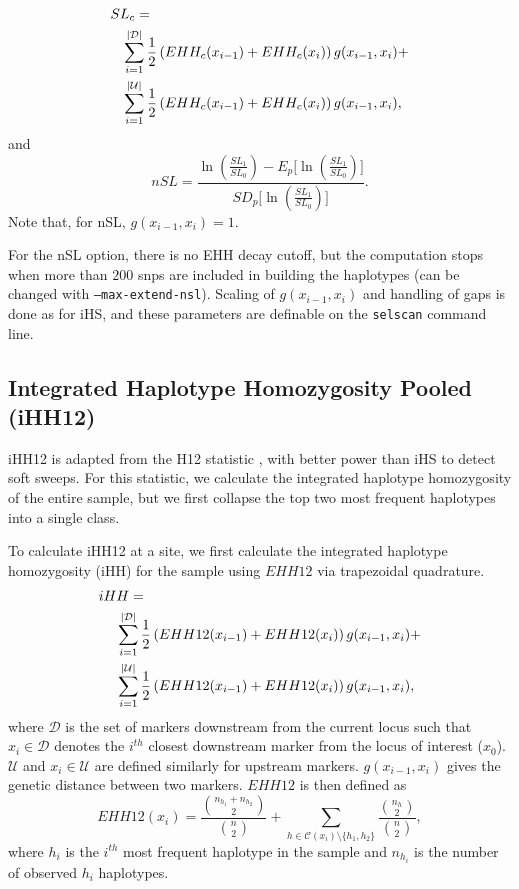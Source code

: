 \documentclass[12pt]{article}%
\newcommand{\negspace}{\!\!\!\!\!\!\!\!\!\!\!\!}
\begin{document}
\begin{align}\label{eq:sl}
SL_c =& \notag\\
&\negspace\sum_{i = 1}^{|\mathcal{D}|} \frac{1}{2}\left(EHH_c(x_{i-1}) + EHH_c(x_i)\right)g(x_{i-1},x_i) + \notag\\
&\negspace\sum_{i = 1}^{|\mathcal{U}|} \frac{1}{2}\left(EHH_c(x_{i-1}) + EHH_c(x_i)\right)g(x_{i-1},x_i),
\end{align}
and
\begin{equation}
nSL = \frac{\ln\left(\frac{SL_1}{SL_0}\right) - E_p\Big[\ln\left(\frac{SL_1}{SL_0}\right)\Big]}{SD_p\Big[\ln\left(\frac{SL_1}{SL_0}\right)\Big]}.
\end{equation}
Note that, for nSL, $g(x_{i-1},x_i) = 1$.

For the nSL option, there is no EHH decay cutoff, but the computation stops when more than $200$ snps are included in building the haplotypes (can be changed with {\tt --max-extend-nsl}).  Scaling of $g(x_{i-1},x_i)$ and handling of gaps is done as for iHS, and these parameters are definable 
on the {\tt selscan} command line.

\subsection{Integrated Haplotype Homozygosity Pooled (iHH12)}\label{sec:ihh12}

iHH12 \cite[]{TorresEtAl17} is adapted from the H12 statistic \cite[]{GarudEtAl15}, with better power than iHS to detect soft sweeps. For this statistic, we calculate the integrated haplotype homozygosity of the entire sample, but we first collapse the top two most frequent haplotypes into a single class.

To calculate iHH12 at a site, we first calculate the integrated haplotype 
homozygosity (iHH) for the sample using $EHH12$ via trapezoidal quadrature.
\begin{align}\label{eq:ihh12}
iHH =& \notag\\
&\negspace\sum_{i = 1}^{|\mathcal{D}|} \frac{1}{2}\left(EHH12(x_{i-1}) + EHH12(x_i)\right)g(x_{i-1},x_i) + \notag\\
&\negspace\sum_{i = 1}^{|\mathcal{U}|} \frac{1}{2}\left(EHH12(x_{i-1}) + EHH12(x_i)\right)g(x_{i-1},x_i),
\end{align}
where $\mathcal{D}$ is the set of markers downstream from the current locus 
such that $x_i \in \mathcal{D}$ denotes the $i^{th}$ closest downstream 
marker from the locus of interest ($x_0$). $\mathcal{U}$ and $x_i \in \mathcal{U}$ are defined similarly 
for upstream markers. $g(x_{i-1},x_i)$ gives the genetic distance between two 
markers.  $EHH12$ is then defined as
\begin{equation}\label{eq:ehh12}
EHH12(x_i) = \frac{{n_{h_1} + n_{h_2} \choose 2}}{{n \choose 2}} + \sum_{h \in \mathcal{C}(x_i)\setminus \{h_1, h_2\}} \frac{{n_h \choose 2}}{{n \choose 2}},
\end{equation}
where $h_i$ is the $i^{th}$ most frequent haplotype in the sample and $n_{h_i}$ is the number of observed $h_i$ haplotypes.
\end{document}
